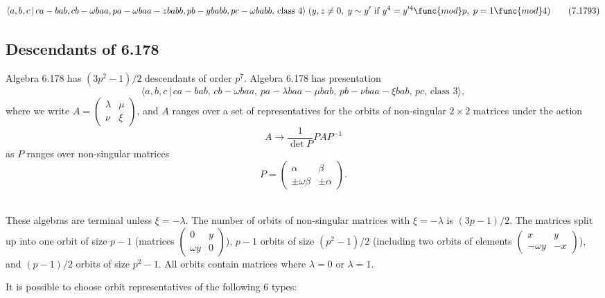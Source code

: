 \documentclass[10pt]{article}
\begin{document}
\begin{equation}
\langle a,b,c\,|\,ca-bab,cb-\omega baa,pa-\omega
baa-zbabb,pb-ybabb,pc-\omega babb,\,\text{class }4\rangle \;(y,z\neq
0,\;y\sim y^{\prime }\text{ if }y^{4}=y^{\prime 4}\func{mod}p,\;p=1\func{mod}%
4)  \tag{7.1793}
\end{equation}

\subsection{Descendants of 6.178}

Algebra 6.178 has $(3p^{2}-1)/2$ descendants of order $p^{7}$. Algebra 6.178
has presentation 
\[
\langle a,b,c\,|\,ca-bab,\,cb-\omega baa,\,pa-\lambda baa-\mu bab,\,pb-\nu
baa-\xi bab,\,pc,\,\text{class }3\rangle , 
\]%
where we write $A=\left( 
\begin{array}{ll}
\lambda & \mu \\ 
\nu & \xi%
\end{array}%
\right) $, and $A$ ranges over a set of representatives for the orbits of
non-singular $2\times 2$ matrices under the action 
\[
A\rightarrow \frac{1}{\det P}PAP^{-1} 
\]%
as $P$ ranges over non-singular matrices 
\[
P=\left( 
\begin{array}{ll}
\alpha & \beta \\ 
\pm \omega \beta & \pm \alpha%
\end{array}%
\right) . 
\]%
$\allowbreak $

These algebras are terminal unless $\xi =-\lambda $. The number of orbits of
non-singular matrices with $\xi =-\lambda $ is $(3p-1)/2$. The matrices
split up into one orbit of size $p-1$ (matrices $\left( 
\begin{array}{ll}
0 & y \\ 
\omega y & 0%
\end{array}%
\right) $), $p-1$ orbits of size $(p^{2}-1)/2$ (including two orbits of
elements $\left( 
\begin{array}{ll}
x & y \\ 
-\omega y & -x%
\end{array}%
\right) $), and $(p-1)/2$ orbits of size $p^{2}-1$. All orbits contain
matrices where $\lambda =0$ or $\lambda =1$.

It is possible to choose orbit representatives of the following 6 types:
\end{document}
